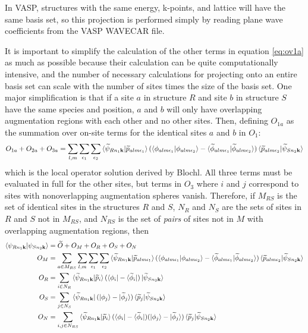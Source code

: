 \documentclass[12pt]{article}
\begin{document}
In VASP, structures with the same energy, k-points, and lattice will have the same basis set,
so this projection is performed simply by reading plane wave coefficients from the VASP WAVECAR file.

It is important to simplify the calculation of the other terms in equation \ref{eq:ov1a} as much
as possible because their calculation can be quite computationally intensive, and the number of
necessary calculations for projecting onto an entire basis set can scale with the number
of sites times the size of the basis set. One major simplification is that if a site $a$ in structure
$R$ and site $b$ in structure $S$ have the same species and position, $a$ and $b$ will only have
overlapping augmentation regions with each other and no other sites. Then, defining $O_{1a}$
as the summation over on-site terms for the identical sites $a$ and $b$ in $O_1$:
$$O_{1a}+O_{2a}+O_{3a}=\sum_{l,m}\sum_{\epsilon_1}\sum_{\epsilon_2}
\braket{\widetilde{\psi}_{Rn_1\mathbf{k}}|\widetilde{p}_{alm\epsilon _1}}
(\braket{\phi_{alm\epsilon _1}|{\phi_{alm\epsilon _2}}}
-\braket{\widetilde{\phi}_{alm\epsilon _1}|\widetilde{\phi}_{alm\epsilon _2}})
\braket{\widetilde{p}_{alm\epsilon _2}|\widetilde{\psi}_{Sn_2\mathbf{k}}}$$
which is the local operator solution derived by Blochl. All three terms must
be evaluated in full for the other sites, but terms in $O_3$ where $i$ and $j$ correspond
to sites with nonoverlapping augmentation spheres vanish. Therefore, if $M_{RS}$ is the set
of identical sites in the structures $R$ and $S$, $N_R$ and $N_S$ are the sets of sites
in $R$ and $S$ not in $M_{RS}$, and $N_{RS}$ is the set of \emph{pairs} of sites not in
$M$ with overlapping augmentation regions, then
\begin{align}
\braket{\psi_{Rn_1\mathbf{k}}|\psi_{Sn_2\mathbf{k}}}&=\widetilde{O}+O_M+O_R+O_S+O_N\\
O_M&=\sum_{a\in M_{RS}}\sum_{l,m}\sum_{\epsilon_1}\sum_{\epsilon_2}
\braket{\widetilde{\psi}_{Rn_1\mathbf{k}}|\widetilde{p}_{alm\epsilon _1}}
(\braket{\phi_{alm\epsilon _1}|{\phi_{alm\epsilon _2}}}
-\braket{\widetilde{\phi}_{alm\epsilon _1}|\widetilde{\phi}_{alm\epsilon _2}})
\braket{\widetilde{p}_{alm\epsilon _2}|\widetilde{\psi}_{Sn_2\mathbf{k}}}\\
O_R&=\sum_{i\in N_R}\braket{\widetilde{\psi}_{Rn_1\mathbf{k}}|\widetilde{p}_i}
(\bra{\phi_i}-\bra{\widetilde{\phi}_i})
\ket{\widetilde{\psi}_{Sn_2\mathbf{k}}}\\
O_S&=\sum_{j\in N_S}\bra{\widetilde{\psi}_{Rn_1\mathbf{k}}}(\ket{\phi_j}
-\ket{\widetilde{\phi}_j})
\braket{\widetilde{p}_j|\widetilde{\psi}_{Sn_2\mathbf{k}}}\\
O_N&=\sum_{i,j\in N_{RS}}\braket{\widetilde{\psi}_{Rn_1\mathbf{k}}|
\widetilde{p}_i}(\bra{\phi_i}-\bra{\widetilde{\phi}_i})
(\ket{\phi_j}-\ket{\widetilde{\phi}_j})
\braket{\widetilde{p}_j|\widetilde{\psi}_{Sn_2\mathbf{k}}}
\label{eq:overlap}
\end{align}
\end{document}
